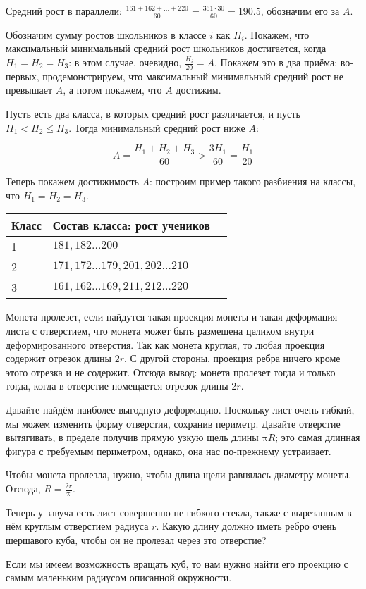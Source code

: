 \begin{itemize}
\itA Средний рост в параллели: $\frac{161 + 162 + \ldots + 220}{60} = \frac{361\cdot 30}{60} = 190.5$,
обозначим его за $A$.

Обозначим сумму ростов школьников в классе $i$ как $H_i$. Покажем, что максимальный 
минимальный средний рост школьников достигается, когда $H_1 = H_2 = H_3$: в этом случае,
очевидно, $\frac{H_i}{20} = A$. Покажем это в два приёма: во-первых, продемонстрируем,
что максимальный минимальный средний рост не превышает $A$, а потом покажем, что
$A$ достижим.

Пусть есть два класса, в которых средний рост различается, и пусть $H_1 < H_2 \le H_3$. 
Тогда минимальный средний рост ниже $A$: 

$$A = \frac{H_1 + H_2 + H_3}{60} > \frac{3H_1}{60} = \frac{H_1}{20}$$

Теперь покажем достижимость $A$: построим пример такого разбиения на классы,
что $H_1 = H_2 = H_3$.

\begin{center}\begin{tabular}{lll}
Класс & Состав класса: рост учеников \\
\hline
1 & $181, 182 \ldots 200$\\
2 & $171, 172 \ldots 179, 201, 202 \ldots 210$ \\
3 & $161, 162 \ldots 169, 211, 212 \ldots 220$
\end{tabular}\end{center}

\itB Монета пролезет, если найдутся такая проекция монеты и такая деформация 
листа с отверстием, что монета может быть размещена целиком внутри деформированного
отверстия. Так как монета круглая, то любая проекция содержит отрезок длины $2r$. 
С другой стороны, проекция ребра ничего кроме этого отрезка и не содержит. 
Отсюда вывод: монета пролезет тогда и только тогда, когда в отверстие помещается 
отрезок длины $2r$.

Давайте найдём наиболее выгодную деформацию.
Поскольку лист очень гибкий, мы можем изменить форму отверстия, сохранив периметр.
Давайте отверстие вытягивать, в пределе получив прямую узкую щель длины $\text{π}R$; это
самая длинная фигура с требуемым периметром, однако, она нас по-прежнему устраивает.

Чтобы монета пролезла, нужно, чтобы длина щели равнялась диаметру монеты. Отсюда, $R = \frac{2r}{\text{π}}$.

\itC Теперь у завуча есть лист совершенно не гибкого стекла, также с вырезанным в нём круглым отверстием 
радиуса $r$. Какую длину должно иметь ребро очень шершавого куба, чтобы он не пролезал через это отверстие?

Если мы имеем возможность вращать куб, то нам нужно найти его проекцию с самым маленьким
радиусом описанной окружности. 

\end{itemize}
